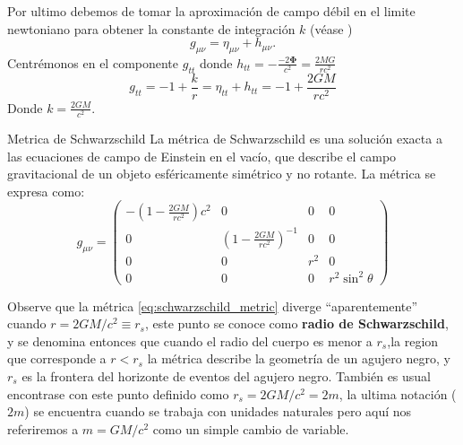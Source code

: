 Por ultimo debemos de tomar la aproximación de campo débil en el limite newtoniano para obtener la constante de integración \( k \) (véase \cite[148-149]{ryder-2009} )
\begin{equation}
    g_{\mu \nu} =  \eta_{\mu \nu}+ h_{\mu \nu} .
\end{equation}
Centrémonos en el componente \( g_{tt} \) donde \( h_{tt} = -\frac{-2 \mathbf{\Phi}}{c^2}  = \frac{2MG}{rc^2}\)
\begin{equation}
    g_{tt} = -1 + \frac{k}{r} = \eta_{tt} + h_{tt} = -1 + \frac{2GM}{rc^2}
\end{equation}
Donde $k = \frac{2GM}{c^2}$.
\begin{definition}{Metrica de Schwarzschild}{}
    La métrica de Schwarzschild es una solución exacta a las ecuaciones de campo de Einstein en el vacío, que describe el campo gravitacional de un objeto esféricamente simétrico y no rotante. La métrica se expresa como:
    \begin{equation}
        g_{\mu \nu}=\left(\begin{array}{cccc}
                -\left(1-\frac{2 G M}{r c^2}\right) c^2 & 0                                       & 0   & 0                  \\
                0                                       & \left(1-\frac{2 G M}{r c^2}\right)^{-1} & 0   & 0                  \\
                0                                       & 0                                       & r^2 & 0                  \\
                0                                       & 0                                       & 0   & r^2 \sin ^2 \theta
            \end{array}\right)
        \label{eq:schwarzschild_metric}
    \end{equation}
\end{definition}
Observe que la métrica  \ref{eq:schwarzschild_metric} diverge ``aparentemente'' cuando \( r = 2GM/c^2 \equiv r_s\), este punto se conoce como \textbf{radio de Schwarzschild},  y se denomina entonces que cuando el radio del cuerpo es menor a  $r_s $,la region que corresponde a $r<r_s $ la métrica describe la geometría de un agujero negro, y $r_s$ es la  frontera del horizonte de eventos del agujero negro. También es usual encontrase con este punto definido como $r_s = 2GM/c^2 =2m $, la ultima notación ($2m$) se encuentra cuando se trabaja con unidades naturales pero aquí  nos referiremos a  $m = GM/c^2$ como un simple cambio de variable.


